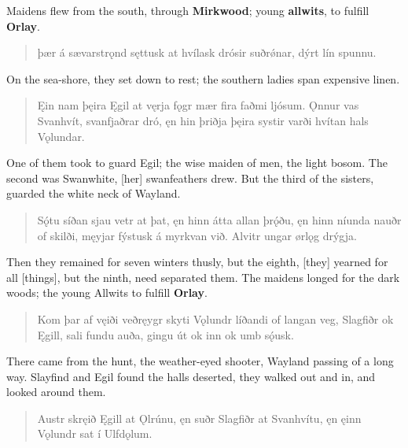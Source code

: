 \bvb Maidens flew from the south, through \textbf{Mirkwood}; young \textbf{allwits}, to fulfill \textbf{Orlay}. \\

\begin{verse}
\bva þær á sævarstrǫnd \hld sęttusk at hvílask
drósir suðrǿnar, \hld dýrt lín spunnu. \\%
\end{verse}

\bvb On the sea-shore, they set down to rest; the southern ladies span expensive linen. \\

\begin{verse}
\bva Ęin nam þęira \hld Ęgil at vęrja
fǫgr mær fira \hld faðmi ljósum.
Ǫnnur vas Svanhvít, \hld svanfjaðrar dró,
ęn hin þriðja \hld þęira systir
varði hvítan \hld hals Vǫlundar. \\%
\end{verse}

\bvb One of them took to guard Egil; the wise maiden of men, the light bosom. The second was Swanwhite, [her] swanfeathers drew. But the third of the sisters, guarded the white neck of Wayland. \\

\begin{verse}
\bva Sǫ́tu síðan \hld sjau vetr at þat,
ęn hinn átta \hld allan þrǫ́ðu,
ęn hinn níunda \hld nauðr of skilði,
męyjar fýstusk \hld á myrkvan við.
Alvitr ungar \hld ørlǫg drýgja. \\%
\end{verse}

\bvb Then they remained for seven winters thusly, but the eighth, [they] yearned for all [things], but the ninth, need separated them. The maidens longed for the dark woods; the young Allwits to fulfill \textbf{Orlay}. \\

\begin{verse}
\bva Kom þar af vęiði \hld veðręygr skyti
Vǫlundr líðandi \hld of langan veg,
Slagfiðr ok Ęgill, \hld sali fundu auða,
gingu út ok inn \hld ok umb sǫ́usk. \\%
\end{verse}

\bvb There came from the hunt, the weather-eyed shooter, Wayland passing of a long way. Slayfind and Egil found the halls deserted, they walked out and in, and looked around them. \\

\begin{verse}
\bva Austr skręið Ęgill \hld at Ǫlrúnu,
ęn suðr Slagfiðr \hld at Svanhvítu,
ęn ęinn Vǫlundr \hld sat í Ulfdǫlum. \\%
\end{verse}

